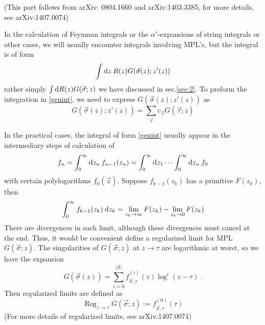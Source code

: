 \documentclass[12pt]{article}
\begin{document}
(This part follows from arXiv: 0804.1660 and arXiv:1403.3385, for more details, see arXiv:1407.0074)
    
In the calculation of Feynman integrals or the $\alpha'$-expansions of string integrals or other cases, we will usually encounter integrals involving MPL's, but the integral is of form 
\begin{equation}
    \int \mathrm{d} z \: R(z) G(\vec{\sigma}(z); z'(z)) \label{genint}
\end{equation}  
rather simply  $\int \mathrm{d} R(z) G(\vec{\sigma};z)$ we have discussed in sec.\ref{sec:2}. To preform the integration in \eqref{genint}, we need to express $G(\vec{\sigma}(z);z'(z))$ as
\begin{equation}
    G(\vec{\sigma}(z);z'(z)) = \sum_{\vec{\tau}}c_{\vec{\tau}} G(\vec{\tau};z) 
\end{equation}

In the practical cases, the integral of form \eqref{genint} usually appear in the intermediary steps of calculation of 
\begin{equation}
    f_{n}=\int_{0}^{\infty} \mathrm{d} z_{n} \: f_{n-1}(z_{n}) = \int_{0}^{\infty}\mathrm{d} z_{1}\cdots \int_{0}^{\infty}\mathrm{d} z_{n}\: f_{0}
\end{equation}
with certain polylogarithms $f_{0}(\vec{z})$. Suppose $f_{k-1}(z_{k})$ has a primitive $F(z_{k})$, then
\begin{equation}
    \int_{0}^{\infty} f_{k-1}(z_{k}) \: \mathrm{d} z_{k} =\lim_{z_{k}\to\infty } F(z_{k}) - \lim_{z_{k}\to 0 } F(z_{k})
\end{equation}
There are divergences in each limit, although these divergences must cancel at the end. Thus, it would be convenient define a regularized limit for MPL $G(\vec{\sigma};z)$. The singularities of $G(\vec{\sigma};z)$ at $z\to \tau$ are logarithmic at worst, so we have the expansion
\begin{equation}
   G(\vec{\sigma}(z)) = \sum_{i=0}^{\lvert \vec{\sigma} \rvert} f_{\vec{\sigma},\tau}^{(i)}(z)\log^{i}(z-\tau)\:.
\end{equation} 
Then regularized limits are defined as 
\begin{equation}
    \operatorname{Reg}_{z\to\tau} G(\vec{\sigma};z):= f^{(0)}_{\vec{\sigma},\tau}(\tau)
\end{equation}
(For more details of regularized limits, see arXiv:1407.0074)
\end{document}
